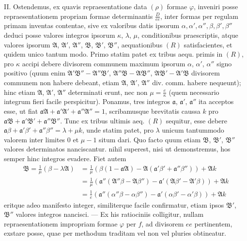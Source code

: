 II. Ostendemus, ex quavis repraesentatione data $(\rho)$ formae $\varphi$, inveniri posse repraesentationem propriam formae determinantis $\frac{D}{ee}$, inter formas per regulam primam inventas contentae, sive ex valoribus datis ipsorum $\alpha,\allowbreak \alpha',\allowbreak \alpha'',\allowbreak \beta,\allowbreak \beta',\allowbreak \beta''$ deduci posse valores integros ipsorum $\kappa$, $\lambda$, $\mu$, conditionibus praescriptis, atque valores ipsorum $\mathfrak{A}$, $\mathfrak{A}'$, $\mathfrak{A}''$, $\mathfrak{B}$, $\mathfrak{B}'$, $\mathfrak{B}''$, aequationibus $(R)$ satisfacientes, et quidem unico tantum modo. Primo statim patet ex tribus aequ. primis in $(R)$, pro $\kappa$ accipi debere divisorem communem maximum ipsorum $\alpha$, $\alpha'$, $\alpha''$ signo positivo (quum enim $\mathfrak{A}'\mathfrak{B}''-\mathfrak{A}''\mathfrak{B}'$, $\mathfrak{A}''\mathfrak{B}-\mathfrak{A}\mathfrak{B}''$, $\mathfrak{A}\mathfrak{B}'-\mathfrak{A}'\mathfrak{B}$ divisorem communem non habere debeant, etiam $\mathfrak{A}$, $\mathfrak{A}'$, $\mathfrak{A}''$ div. comm. habere nequeunt); hinc etiam $\mathfrak{A}$, $\mathfrak{A}'$, $\mathfrak{A}''$ determinati erunt, nec non $\mu=\frac{e}{\kappa}$ (quem necessario integrum fieri facile perspicitur). Ponamus, tres integros $\mathfrak{a}$, $\mathfrak{a}'$, $\mathfrak{a}''$ ita acceptos esse, ut fiat $\mathfrak{a}\mathfrak{A}+\mathfrak{a}'\mathfrak{A}'+\mathfrak{a}''\mathfrak{A}''=1$, scribamusque brevitatis caussa $k$ pro $\mathfrak{a}\mathfrak{B}+\mathfrak{a}'\mathfrak{B}'+\mathfrak{a}''\mathfrak{B}''$.
Tunc ex tribus ultimis aeq. $(R)$ sequitur, esse debere $\mathfrak{a}\beta+\mathfrak{a}'\beta'+\mathfrak{a}''\beta''=\lambda+\mu k$, unde statim patet, pro $\lambda$ unicum tantummodo valorem inter limites $0$ et $\mu-1$ situm dari. Quo facto quum etiam $\mathfrak{B}$, $\mathfrak{B}'$, $\mathfrak{B}''$ valores determinatos nanciscantur. nihil superest, nisi ut demonstremus, hos semper hinc integros evadere. Fiet autem
\[
\begin{aligned}
\mathfrak{B}=\frac{1}{\mu}(\beta-\lambda\mathfrak{A})
&=\frac{1}{\mu}(\beta(1-\mathfrak{a}\mathfrak{A})-\mathfrak{A}(\mathfrak{a}'\beta'+\mathfrak{a}''\beta''))+\mathfrak{A}k\\
&=\frac{1}{\mu}(\mathfrak{a}''(\mathfrak{A}''\beta-\mathfrak{A}\beta'')-\mathfrak{a}'(\mathfrak{A}\beta'-\mathfrak{A}'\beta))+\mathfrak{A}k\\
&=\frac{1}{e}(\mathfrak{a}''(\alpha''\beta-\alpha\beta'')-\mathfrak{a}'(\alpha\beta'-\alpha'\beta))+\mathfrak{A}k
\end{aligned}
\]
eritque adeo manifesto integer, similiterque facile confirmatur, etiam ipsos $\mathfrak{B}'$, $\mathfrak{B}''$ valores integros nancisci. --- Ex his ratiociniis colligitur, nullam repraesentationem impropriam formae $\varphi$ per $f$, ad divisorem $ee$ pertinentem, exstare posse, quae per methodum traditam vel non vel pluries obtineatur.

